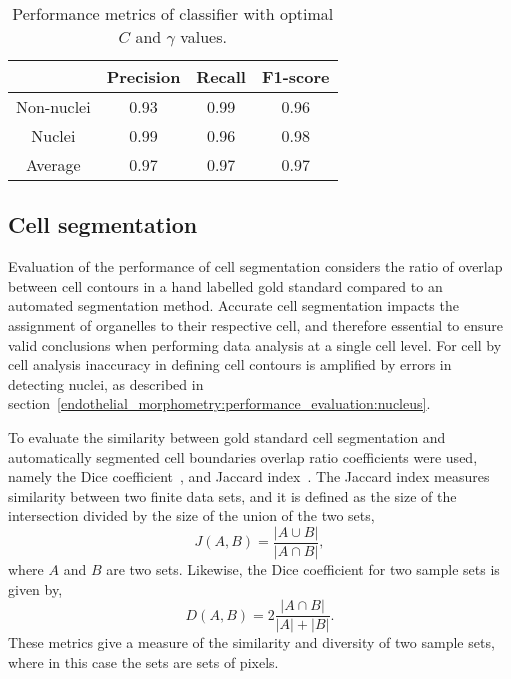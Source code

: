 \begin{table}[htbp]
\caption{Performance metrics of classifier with optimal $C$ and $\gamma$ values.}
\centering
\label{table:endothelial_morphometry:performance_metrics}
\begin{tabular}{cccc}
	\toprule
	& Precision  & Recall & F1-score\\
	\midrule
	Non-nuclei   & 0.93       & 0.99   & 0.96    \\
	Nuclei       & 0.99       & 0.96   & 0.98    \\
	\bottomrule
	\toprule
	Average      & 0.97       & 0.97     & 0.97    \\
	\bottomrule
\end{tabular}
\end{table}

\subsection{Cell segmentation}
\label{endothelial_morphometry:performance_evaluation:cell}
Evaluation of the performance of cell segmentation considers the ratio of overlap between cell contours in a hand labelled gold standard compared to an automated segmentation method. Accurate cell segmentation impacts the assignment of organelles to their respective cell, and therefore essential to ensure valid conclusions when performing data analysis at a single cell level. For cell by cell analysis inaccuracy in defining cell contours is amplified by errors in detecting nuclei, as described in section~\ref{endothelial_morphometry:performance_evaluation:nucleus}.

To evaluate the similarity between gold standard cell segmentation and automatically segmented cell boundaries overlap ratio coefficients were used, namely the Dice coefficient~\cite{Dice1945}, and Jaccard index~\cite{Jaccard1912}. The Jaccard index measures similarity between two finite data sets, and it is defined as the size of the intersection divided by the size of the union of the two sets,
\begin{equation}
J(A,B) = \frac{|A\cup B|}{|A \cap B|} ,
\end{equation}
where $A$ and $B$ are two sets. Likewise, the Dice coefficient for two sample sets is given by,
\begin{equation}
D(A,B) = 2 \frac{|A\cap B|}{|A| + |B|}.
\end{equation} 
These metrics give a measure of the similarity and diversity of two sample sets, where in this case the sets are sets of pixels.

